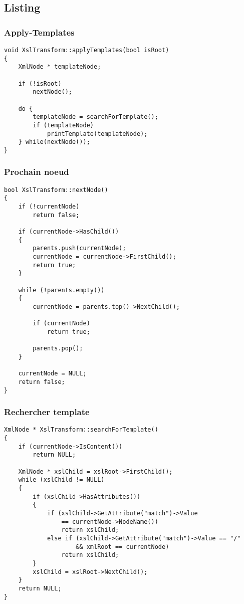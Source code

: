 	\subsection {Listing}
	\lstset{language=c++} 
	\lstset{commentstyle=\textit} 
		
	\subsubsection {Apply-Templates}
	\begin{lstlisting} 
void XslTransform::applyTemplates(bool isRoot)
{
	XmlNode * templateNode;	

	if (!isRoot)
		nextNode();
	
	do {
		templateNode = searchForTemplate();
		if (templateNode)
			printTemplate(templateNode);
	} while(nextNode());
}
	\end{lstlisting} 

	\subsubsection {Prochain noeud}
	\begin{lstlisting} 
bool XslTransform::nextNode()
{
	if (!currentNode)
		return false;
		
	if (currentNode->HasChild())
	{
		parents.push(currentNode);
		currentNode = currentNode->FirstChild();
		return true;
	}
		
	while (!parents.empty())
	{
		currentNode = parents.top()->NextChild();
		
		if (currentNode)
			return true;
		
		parents.pop();
	}
	
	currentNode = NULL;
	return false;
}
	\end{lstlisting} 

	\subsubsection {Rechercher template}
	\begin{lstlisting} 
XmlNode * XslTransform::searchForTemplate()
{	
	if (currentNode->IsContent())
		return NULL;
		
	XmlNode * xslChild = xslRoot->FirstChild();
	while (xslChild != NULL)
	{
		if (xslChild->HasAttributes())
		{
			if (xslChild->GetAttribute("match")->Value 
				== currentNode->NodeName())
				return xslChild;
			else if (xslChild->GetAttribute("match")->Value == "/"
					&& xmlRoot == currentNode)
				return xslChild;
		}
		xslChild = xslRoot->NextChild();
	}
	return NULL;
}
	\end{lstlisting} 

